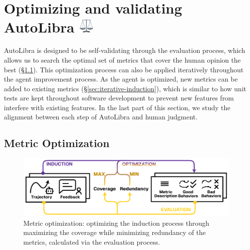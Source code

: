 \section{Optimizing and validating AutoLibra \protect
  \includegraphics[height=1em]{figs/scale.png}}
AutoLibra is designed to be self-validating through the evaluation process,
which allows us to search the optimal set of metrics that cover the human
opinion the best (\S\ref{sec:metric-optimization}). This optimization process
can also be applied iteratively throughout the agent improvement process. As the
agent is optimized, new metrics can be added to existing metrics (\S\ref{sec:iterative-induction}),
which is similar to how unit tests are kept throughout software development to
prevent new features from interfere with existing features. In the last part of this
section, we study the alignment between each step of AutoLibra and human
judgment.

\subsection{Metric Optimization}
\label{sec:metric-optimization}

\begin{figure}[!t]
	\centering
	\includegraphics[width=0.8\linewidth]{figs/autolibra_optimization.pdf}
	\caption{Metric optimization: optimizing the induction process through maximizing
		the coverage while minimizing redundancy of the metrics, calculated via the
		evaluation process.}
	\label{fig:autolibra_optimization}
\end{figure}

